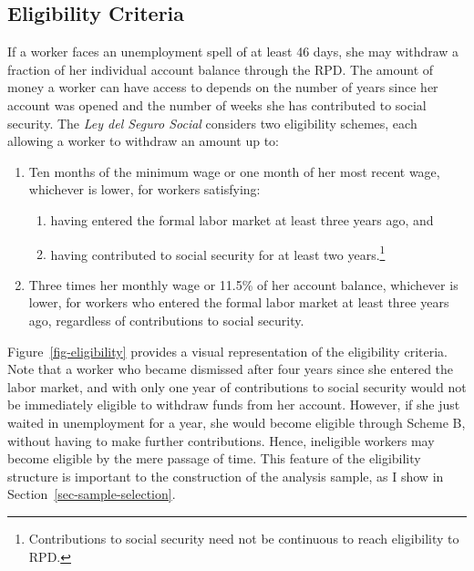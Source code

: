 \documentclass[
  4pt,
]{report}
\begin{document}
\subsection{Eligibility Criteria}\label{eligibility-criteria}

If a worker faces an unemployment spell of at least 46 days, she may
withdraw a fraction of her individual account balance through the RPD.
The amount of money a worker can have access to depends on the number of
years since her account was opened and the number of weeks she has
contributed to social security. The \emph{Ley del Seguro Social}
considers two eligibility schemes, each allowing a worker to withdraw an
amount up to:

\begin{enumerate}
\def\labelenumi{\Alph{enumi}.}
\item
  Ten months of the minimum wage or one month of her most recent wage,
  whichever is lower, for workers satisfying:

  \begin{enumerate}
  \def\labelenumii{\roman{enumii}.}
  \item
    having entered the formal labor market at least three years ago, and
  \item
    having contributed to social security for at least two
    years.\footnote{Contributions to social security need not be
      continuous to reach eligibility to RPD.}
  \end{enumerate}
\item
  Three times her monthly wage or 11.5\% of her account balance,
  whichever is lower, for workers who entered the formal labor market at
  least three years ago, regardless of contributions to social security.
\end{enumerate}

Figure~\ref{fig-eligibility} provides a visual representation of the
eligibility criteria. Note that a worker who became dismissed after four
years since she entered the labor market, and with only one year of
contributions to social security would not be immediately eligible to
withdraw funds from her account. However, if she just waited in
unemployment for a year, she would become eligible through Scheme B,
without having to make further contributions. Hence, ineligible workers
may become eligible by the mere passage of time. This feature of the
eligibility structure is important to the construction of the analysis
sample, as I show in Section~\ref{sec-sample-selection}.
\end{document}
